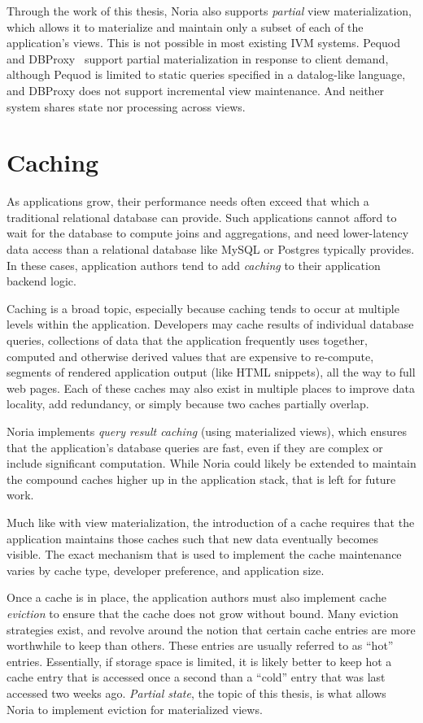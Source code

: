 Through the work of this thesis, Noria also supports \emph{partial} view
materialization, which allows it to materialize and maintain only a subset of
each of the application's views. This is not possible in most existing IVM
systems. Pequod~\cite{pequod} and DBProxy~\cite{dbproxy} support partial
materialization in response to client demand, although Pequod is limited to
static queries specified in a datalog-like language, and DBProxy does not
support incremental view maintenance. And neither system shares state nor
processing across views.

\section{Caching}

As applications grow, their performance needs often exceed that which a
traditional relational database can provide. Such applications cannot afford to
wait for the database to compute joins and aggregations, and need lower-latency
data access than a relational database like MySQL or Postgres typically
provides. In these cases, application authors tend to add \textit{caching} to
their application backend logic.

Caching is a broad topic, especially because caching tends to occur at multiple
levels within the application. Developers may cache results of individual
database queries, collections of data that the application frequently uses
together, computed and otherwise derived values that are expensive to
re-compute, segments of rendered application output (like HTML snippets), all
the way to full web pages. Each of these caches may also exist in multiple
places to improve data locality, add redundancy, or simply because two caches
partially overlap.

Noria implements \textit{query result caching} (using materialized views), which
ensures that the application's database queries are fast, even if they are
complex or include significant computation. While Noria could likely be extended
to maintain the compound caches higher up in the application stack, that is left
for future work.

Much like with view materialization, the introduction of a cache requires that
the application maintains those caches such that new data eventually becomes
visible. The exact mechanism that is used to implement the cache maintenance
varies by cache type, developer preference, and application size.

Once a cache is in place, the application authors must also implement cache
\textit{eviction} to ensure that the cache does not grow without bound. Many
eviction strategies exist, and revolve around the notion that certain cache
entries are more worthwhile to keep than others. These entries are usually
referred to as ``hot'' entries. Essentially, if storage space is limited, it is
likely better to keep hot a cache entry that is accessed once a second than a
``cold'' entry that was last accessed two weeks ago. \textit{Partial state}, the
topic of this thesis, is what allows Noria to implement eviction for
materialized views.

